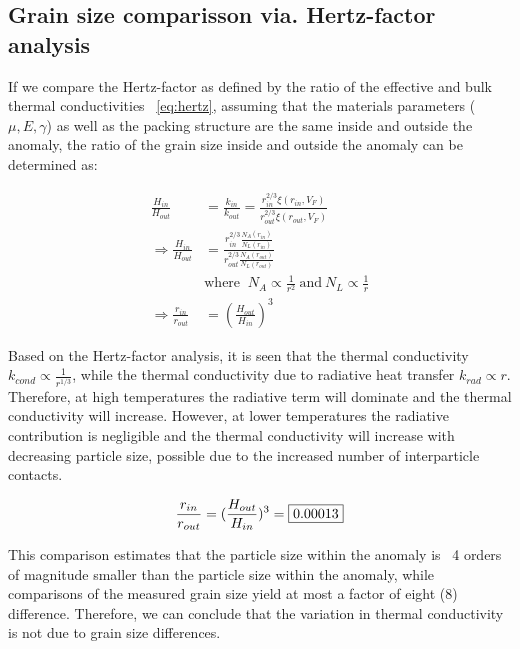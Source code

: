 \documentclass[11pt]{article} %
\newcommand{\vf}{\ensuremath{V_{F}}\xspace}
\begin{document}
\subsection{Grain size comparisson via. Hertz-factor analysis}
	
	If we compare the Hertz-factor as defined by the ratio of the effective and bulk thermal conductivities ~\eqref{eq:hertz}, assuming that the materials parameters ($\mu, E, \gamma$) as well as the packing structure are the same inside and outside the anomaly, the ratio of the grain size inside and outside the anomaly can be determined as:
	
	\begin{equation}
	\begin{split}
	\frac{H_{in}}{H_{out}} &= \frac{k_{in}}{k_{out}} = \frac{r_{in}^{2/3} \xi(r_{in}, \vf)}{r_{out}^{2/3} \xi(r_{out}, \vf)} \\
	\Rightarrow \frac{H_{in}}{H_{out}} &= \frac{r_{in}^{2/3} \frac{N_{A}(r_{in})}{N_{L}(r_{in})}}{r_{out}^{2/3} \frac{N_{A}(r_{out})}{N_{L}(r_{out})}} \\
	& \text{where }\: N_{A}\varpropto \frac{1}{r^{2}} \: \text{and} \: N_{L}\varpropto \frac{1}{r} \\
	\Rightarrow \frac{r_{in}}{r_{out}} &= (\frac{H_{out}}{H_{in}})^{3}
	\end{split}
	\end{equation}
	
	Based on the Hertz-factor analysis, it is seen that the thermal conductivity $k_{cond} \varpropto \frac{1}{r^{1/3}}$, while the thermal conductivity due to radiative heat transfer $k_{rad} \varpropto r$. Therefore, at high temperatures the radiative term will dominate and the thermal conductivity will increase. However, at lower temperatures the radiative contribution is negligible and the thermal conductivity will increase with decreasing particle size, possible due to the increased number of interparticle contacts. 
	
	\begin{equation}
	 \frac{r_{in}}{r_{out}} = (\frac{H_{out}}{H_{in}})^{3} = \fbox{0.00013}
	 \end{equation}

	This comparison estimates that the particle size within the anomaly is ~4 orders of magnitude smaller than the particle size within the anomaly, while comparisons of the measured grain size yield at most a factor of eight (8) difference. Therefore, we can conclude that the variation in thermal conductivity is not due to grain size differences. 
	
\end{document}
